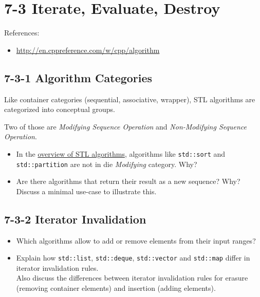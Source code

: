 \documentclass[]{article}
\providecommand{\tightlist}{%
  \setlength{\itemsep}{0pt}\setlength{\parskip}{0pt}}
\begin{document}
\section{7-3 Iterate, Evaluate, Destroy}\label{iterate-evaluate-destroy}

References:

\begin{itemize}
\tightlist
\item
  \url{http://en.cppreference.com/w/cpp/algorithm}
\end{itemize}

\subsection{7-3-1 Algorithm Categories}\label{algorithm-categories}

Like container categories (sequential, associative, wrapper), STL
algorithms are categorized into conceptual groups.

Two of those are \emph{Modifying Sequence Operation} and
\emph{Non-Modifying Sequence Operation}.

\begin{itemize}
\tightlist
\item
  In the \href{http://en.cppreference.com/w/cpp/algorithm}{overview of
  STL algorithms}, algorithms like \texttt{std::sort} and
  \texttt{std::partition} are not in die \emph{Modifying} category. Why?

\item
  Are there algorithms that return their result as a new sequence? Why?
  Discuss a minimal use-case to illustrate this.
\end{itemize}

\subsection{7-3-2 Iterator Invalidation}\label{iterator-invalidation}

\begin{itemize}
\tightlist
\item
  Which algorithms allow to add or remove elements from their input
  ranges?
\item
  Explain how \texttt{std::list}, \texttt{std::deque},
  \texttt{std::vector} and \texttt{std::map} differ in iterator
  invalidation rules.\\
   Also discuss the differences between iterator invalidation rules for
  erasure (removing container elements) and insertion (adding elements).
\end{itemize}
\end{document}
